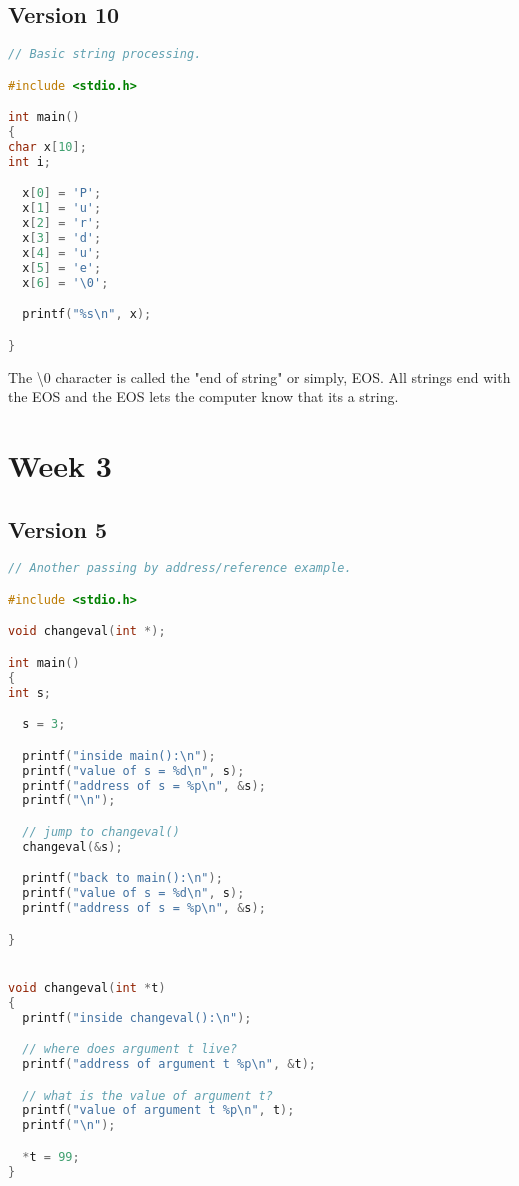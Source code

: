 \documentclass{article}
\begin{document}
\subsection*{Version 10}
\begin{lstlisting}[language=C]
// Basic string processing.

#include <stdio.h>

int main()
{
char x[10];
int i;

  x[0] = 'P';
  x[1] = 'u';
  x[2] = 'r';
  x[3] = 'd';
  x[4] = 'u';
  x[5] = 'e';
  x[6] = '\0';

  printf("%s\n", x);

}
\end{lstlisting}


The \textbackslash0 character is called the "end of string" or simply, EOS. All strings end with the EOS and the EOS lets the computer know that its a string.

\section*{Week 3}
\subsection*{Version 5}
\begin{lstlisting}[language=C]
// Another passing by address/reference example.

#include <stdio.h>

void changeval(int *);

int main()
{
int s;

  s = 3;

  printf("inside main():\n");
  printf("value of s = %d\n", s);
  printf("address of s = %p\n", &s);
  printf("\n");

  // jump to changeval()
  changeval(&s);

  printf("back to main():\n");
  printf("value of s = %d\n", s);
  printf("address of s = %p\n", &s);

}


void changeval(int *t)
{
  printf("inside changeval():\n");

  // where does argument t live?
  printf("address of argument t %p\n", &t);

  // what is the value of argument t?
  printf("value of argument t %p\n", t);
  printf("\n");

  *t = 99;
}
\end{lstlisting}
\end{document}
